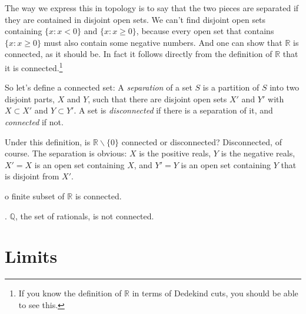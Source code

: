 \documentclass{article}
\def\R{{\mathbb R}}
\newcounter{exercisecounter}\setcounter{exercisecounter}{1}
\def\Exercise.#1\par{{\item\small {\bf Exercise \number\theexercisecounter}.#1\addtocounter{exercisecounter}{1}}}
\begin{document}
The way we express this in topology is to say that the two pieces are
separated if they are contained in disjoint open sets.  We can't find
disjoint open sets containing $\{x : x<0\}$ and $\{x : x\ge0\}$,
because every open set that contains $\{x : x\ge0\}$ must also contain
some negative numbers.  And one can show that $\R$ is connected, as it
should be.  In fact it follows directly from the definition of $\R$
that it is connected.\footnote{If you know the definition of $\R$ in
terms of Dedekind cuts, you should be able to see this.}

So let's define a connected set: A {\em separation} of a set $S$ is a
partition of $S$ into two disjoint parts, $X$ and $Y$, such that there
are disjoint open sets $X'$ and $Y'$ with $X\subset X'$ and $Y \subset
Y'$.  A set is {\em disconnected\/} if there is a separation of it,
and {\em connected\/} if not.


Under this definition, is $\R\backslash\{0\}$ connected or
disconnected?  Disconnected, of course.  The separation is obvious:
$X$ is the positive reals, $Y$ is the negative reals, $X'=X$ is an
open set containing $X$, and $Y'=Y$ is an open set containing $Y$ that
is disjoint from $X'$.

\begin{itemize}
\Exercise. No finite subset of $\R$ is connected.

\Exercise. $\mathbb Q$, the set of rationals, is not connected.

\end{itemize}


\section*{Limits}
\end{document}
